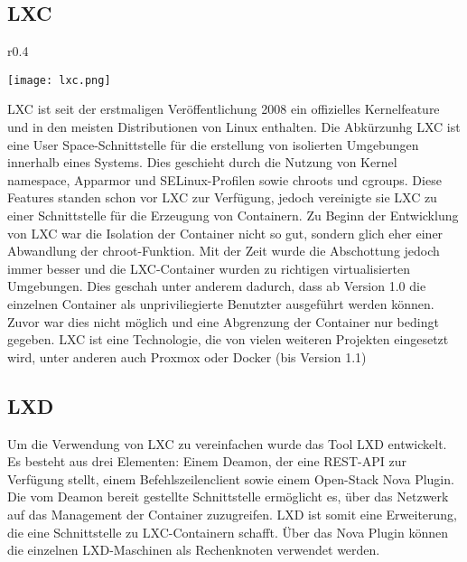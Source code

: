 \subsection*{LXC}
\label{sec:lxc}
\begin{wrapfigure}{r}{0.4\textwidth}
	\vspace{-40pt}
	\begin{center}
		\texttt{[image: lxc.png]}
	\end{center}
	\vspace{-15pt}
	\caption[Logo LXC]{ \footnotemark}
	\label{fig:lxc}
	\vspace{-30pt}
\end{wrapfigure}
LXC ist seit der erstmaligen Veröffentlichung 2008 ein offizielles Kernelfeature und in den meisten Distributionen von Linux enthalten. Die Abkürzunhg LXC ist eine User Space-Schnittstelle für die erstellung von isolierten Umgebungen innerhalb eines Systems. Dies geschieht durch die Nutzung von Kernel namespace, Apparmor und SELinux-Profilen sowie chroots und cgroups. Diese Features standen schon vor LXC zur Verfügung, jedoch vereinigte sie LXC zu einer Schnittstelle für die Erzeugung von Containern. Zu Beginn der Entwicklung von LXC war die Isolation der Container nicht so gut, sondern glich eher einer Abwandlung der chroot-Funktion. Mit der Zeit wurde die Abschottung jedoch immer besser und die LXC-Container wurden zu richtigen virtualisierten Umgebungen. Dies geschah unter anderem dadurch, dass ab Version 1.0 die einzelnen Container als unpriviliegierte Benutzter ausgeführt werden können. Zuvor war dies nicht möglich und eine Abgrenzung der Container nur bedingt gegeben. LXC ist eine Technologie, die von vielen weiteren Projekten eingesetzt wird, unter anderen auch Proxmox oder Docker (bis Version 1.1)\cite{LXCHomepage,IEEE7036275, IEEE7185212, IEEE7571957,IEEE7929714}


\subsection*{LXD}
\label{sec:lxd}

Um die Verwendung von LXC zu vereinfachen wurde das Tool LXD entwickelt. Es besteht aus drei Elementen: Einem Deamon, der eine REST-API zur Verfügung stellt, einem Befehlszeilenclient sowie einem Open-Stack Nova Plugin. Die vom Deamon bereit gestellte Schnittstelle ermöglicht es, über das Netzwerk auf das Management der Container zuzugreifen. LXD ist somit eine Erweiterung, die eine Schnittstelle zu LXC-Containern schafft. Über das Nova Plugin können die einzelnen LXD-Maschinen als Rechenknoten verwendet werden. \cite{LXDHomepage}


